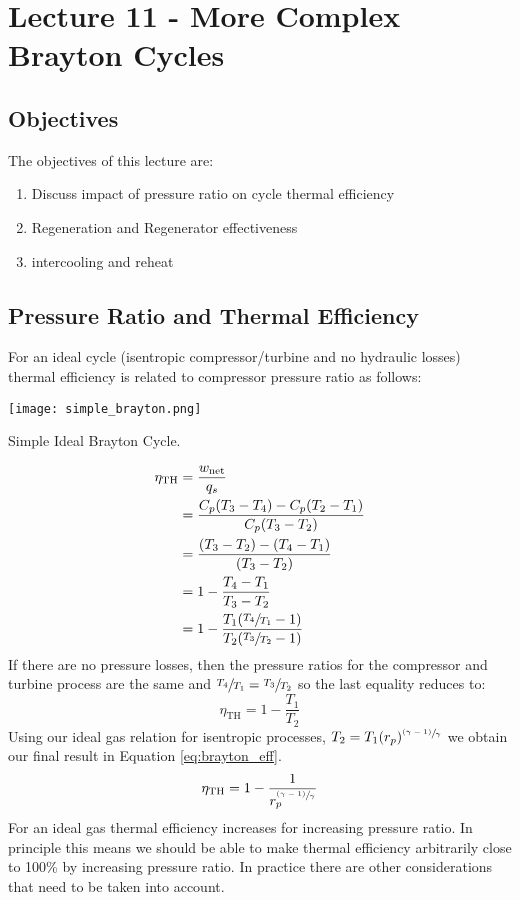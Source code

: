 \chapter{Lecture 11 - More Complex Brayton Cycles}
\label{ch:ch11}
\section{Objectives}
The objectives of this lecture are:
\begin{enumerate}
\item Discuss impact of pressure ratio on cycle thermal efficiency
\item Regeneration and Regenerator effectiveness
\item intercooling and reheat
\end{enumerate}

\section{Pressure Ratio and Thermal Efficiency}
For an ideal cycle (isentropic compressor/turbine and no hydraulic losses) thermal efficiency is related to compressor pressure ratio as follows:
\begin{marginfigure}
\texttt{[image: simple\_brayton.png]}
\caption{Simple Ideal Brayton Cycle.}
\end{marginfigure}
\begin{align*}
\eta_{\text{TH}} &=\frac{w_{\text{net}}}{q_s} \\
                 &= \frac{C_p(T_3 - T_4) - C_p(T_2 - T_1)}{C_p(T_3 - T_2)} \\
                 &=\frac{(T_3 - T_2) - (T_4 - T_1)}{(T_3 - T_2)} \\
                 &=1 - \frac{T_4 - T_1}{T_3 - T_2} \\
                 &=1 - \frac{T_1(\sfrac{T_4}{T_1}-1)}{T_2(\sfrac{T_3}{T_2}-1)}
\end{align*}
If there are no pressure losses, then the pressure ratios for the compressor and turbine process are the same and $\sfrac{T_4}{T_1} = \sfrac{T_3}{T_2}$ so the last equality reduces to:
\begin{equation*}
\eta_{\text{TH}}=1 - \frac{T_1}{T_2}
\end{equation*}
Using our ideal gas relation for isentropic processes, $T_2 = T_1(r_p)^{\sfrac{(\gamma - 1)}{\gamma}}$ we obtain our final result in Equation \ref{eq:brayton_eff}.
\begin{equation}
\eta_{\text{TH}}=1 - \frac{1}{r_p^{\sfrac{(\gamma - 1)}{\gamma}}}
\label{eq:brayton_eff}
\end{equation}
For an ideal gas thermal efficiency increases for increasing pressure ratio. In principle this means we should be able to make thermal efficiency arbitrarily close to 100\% by increasing pressure ratio. In practice there are other considerations that need to be taken into account.

